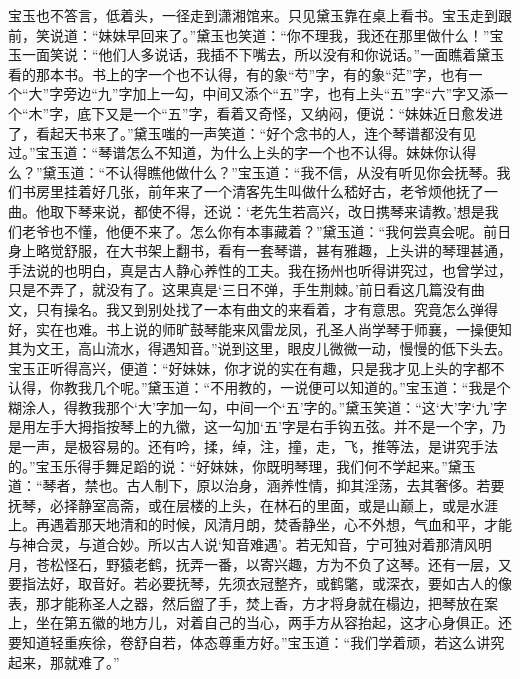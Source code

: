 \begin{parag}
    宝玉也不答言，低着头，一径走到潇湘馆来。只见黛玉靠在桌上看书。宝玉走到跟前，笑说道：“妹妹早回来了。”黛玉也笑道：“你不理我，我还在那里做什么！”宝玉一面笑说：“他们人多说话，我插不下嘴去，所以没有和你说话。”一面瞧着黛玉看的那本书。书上的字一个也不认得，有的象“芍”字，有的象“茫”字，也有一个“大”字旁边“九”字加上一勾，中间又添个“五”字，也有上头“五”字“六”字又添一个“木”字，底下又是一个“五”字，看着又奇怪，又纳闷，便说：“妹妹近日愈发进了，看起天书来了。”黛玉嗤的一声笑道：“好个念书的人，连个琴谱都没有见过。”宝玉道：“琴谱怎么不知道，为什么上头的字一个也不认得。妹妹你认得么？”黛玉道：“不认得瞧他做什么？”宝玉道：“我不信，从没有听见你会抚琴。我们书房里挂着好几张，前年来了一个清客先生叫做什么嵇好古，老爷烦他抚了一曲。他取下琴来说，都使不得，还说：‘老先生若高兴，改日携琴来请教。’想是我们老爷也不懂，他便不来了。怎么你有本事藏着？”黛玉道：“我何尝真会呢。前日身上略觉舒服，在大书架上翻书，看有一套琴谱，甚有雅趣，上头讲的琴理甚通，手法说的也明白，真是古人静心养性的工夫。我在扬州也听得讲究过，也曾学过，只是不弄了，就没有了。这果真是‘三日不弹，手生荆棘。’前日看这几篇没有曲文，只有操名。我又到别处找了一本有曲文的来看着，才有意思。究竟怎么弹得好，实在也难。书上说的师旷鼓琴能来风雷龙凤，孔圣人尚学琴于师襄，一操便知其为文王，高山流水，得遇知音。”说到这里，眼皮儿微微一动，慢慢的低下头去。宝玉正听得高兴，便道：“好妹妹，你才说的实在有趣，只是我才见上头的字都不认得，你教我几个呢。”黛玉道：“不用教的，一说便可以知道的。”宝玉道：“我是个糊涂人，得教我那个‘大’字加一勾，中间一个‘五’字的。”黛玉笑道：“这‘大’字‘九’字是用左手大拇指按琴上的九徽，这一勾加‘五’字是右手钩五弦。并不是一个字，乃是一声，是极容易的。还有吟，揉，绰，注，撞，走，飞，推等法，是讲究手法的。”宝玉乐得手舞足蹈的说：“好妹妹，你既明琴理，我们何不学起来。”黛玉道：“琴者，禁也。古人制下，原以治身，涵养性情，抑其淫荡，去其奢侈。若要抚琴，必择静室高斋，或在层楼的上头，在林石的里面，或是山巅上，或是水涯上。再遇着那天地清和的时候，风清月朗，焚香静坐，心不外想，气血和平，才能与神合灵，与道合妙。所以古人说‘知音难遇’。若无知音，宁可独对着那清风明月，苍松怪石，野猿老鹤，抚弄一番，以寄兴趣，方为不负了这琴。还有一层，又要指法好，取音好。若必要抚琴，先须衣冠整齐，或鹤氅，或深衣，要如古人的像表，那才能称圣人之器，然后盥了手，焚上香，方才将身就在榻边，把琴放在案上，坐在第五徽的地方儿，对着自己的当心，两手方从容抬起，这才心身俱正。还要知道轻重疾徐，卷舒自若，体态尊重方好。”宝玉道：“我们学着顽，若这么讲究起来，那就难了。”
\end{parag}


